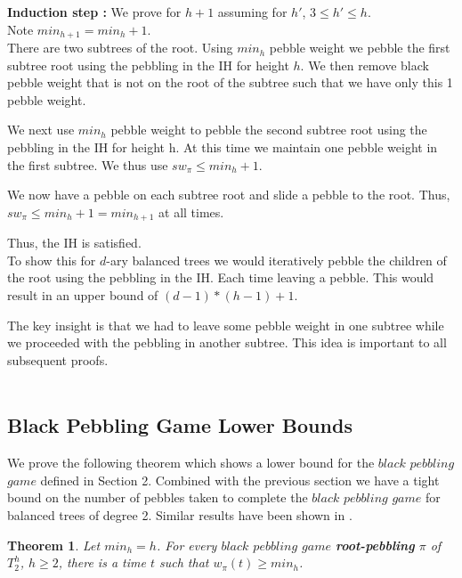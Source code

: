 \documentclass[12pt]{article}
\newtheorem{theorem}{Theorem}[subsection]
\begin{document}

\noindent
{\bf Induction step :} We prove for $h+1$ assuming for $h'$,
$3\le h' \le h$.\\
Note $min_{h+1} = min_h + 1$.\\

There are two subtrees of the root. Using $min_h$ pebble weight we pebble the first subtree root using the pebbling in the IH for height $h$. We then remove black pebble weight that is not on the root of the subtree such that we have only this 1 pebble weight. 

We next use $min_h$ pebble weight to pebble the second subtree root using the pebbling in the IH for height h. At this time we maintain one pebble weight in the first subtree. We thus use $sw_\pi \leq min_h + 1$.

We now have a pebble on each subtree root and slide a pebble to the root. Thus, $sw_\pi \leq min_h + 1 = min_{h+1}$ at all times.

Thus, the IH is satisfied.\\

To show this for $d$-ary balanced trees we would iteratively pebble the children of the root using the pebbling in the IH. Each time leaving a pebble. This would result in an upper bound of $(d-1) * (h-1) + 1$.

The key insight is that we had to leave some pebble weight in one subtree while we proceeded with the pebbling in another subtree. This idea is important to all subsequent proofs.\\\\








\subsection{Black Pebbling Game Lower Bounds} 


We prove the following theorem which shows a lower bound for the $black$ $pebbling$ $game$ defined in Section 2. Combined with the previous section we have a tight bound on the number of pebbles taken to complete the $black$ $pebbling$ $game$ for balanced trees of degree 2. Similar results have been shown in \cite{c:pebjournal}.\\

\begin{theorem}\label{bplb}
Let $min_h = h$.
For every $black$ $pebbling$ $game$ {\bf root-pebbling} $\pi$ of $T^h_2$, $h \geq 2$, there is a time $t$ such
that $w_\pi(t) \ge min_h$.
\end{theorem}
\end{document}
